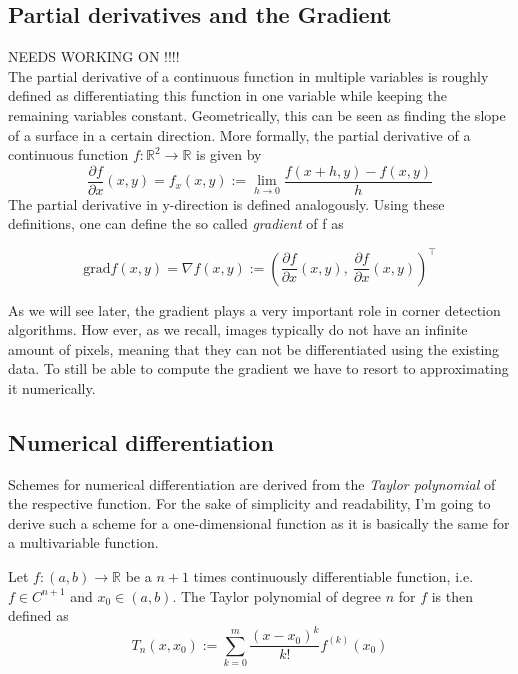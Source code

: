 \subsection*{Partial derivatives and the Gradient}
NEEDS WORKING ON !!!!\\
The partial derivative of a continuous function in multiple variables is roughly defined as differentiating 
this function in one variable while keeping the remaining variables constant. Geometrically, this
can be seen as finding the slope of a surface in a certain direction. More formally, the partial
derivative of a continuous function $f:\mathbb{R}^2\rightarrow\mathbb{R}$ is given by
\begin{equation}
    \frac{\partial f}{\partial x} (x, y) = f_x(x, y) := \lim_{h\rightarrow0}\frac{f(x+h,y) -
        f(x,y)}{h}
\end{equation}
The partial derivative in y-direction is defined analogously.
Using these definitions, one can define the so called \textit{gradient} of f as

\begin{equation}
    \text{grad} f(x, y)= \nabla f(x, y):= \left( \frac{\partial f}{\partial x}(x,y),\ \frac{\partial
            f}{\partial x}(x,y)\right)^\top
\end{equation}

As we will see later, the gradient plays a very important role in corner detection algorithms. 
How ever, as we recall, images typically do not have an infinite amount of pixels, meaning that 
they
can not be differentiated using the existing data. To
still be able to compute the gradient we have to resort to approximating it numerically.

\subsection*{Numerical differentiation}

Schemes for numerical differentiation are derived from the \textit{Taylor polynomial} of the
respective function. For the sake of simplicity and readability, I'm going to derive such a scheme for a
one-dimensional function as it is basically the same for a multivariable function. 

Let $f: (a, b) \rightarrow \mathbb{R}$ be a $n+1$ times continuously differentiable function, i.e.
$f \in C^{n+1}$ and $x_0 \in (a, b)$. The Taylor polynomial of degree $n$ for $f$ is then defined as
\begin{equation}\label{eq:Taylor}
    T_n(x, x_0) := \sum\limits_{k = 0}^{m} \frac{(x-x_0)^k}{k!}f^{(k)}(x_0)
\end{equation}

